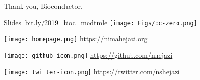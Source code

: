 \documentclass{beamer}
\begin{document}

\begin{frame}[c]{Thank you, Bioconductor.}

\large
Slides: \href{https://bit.ly/2019\_bioc\_modtmle}{bit.ly/2019\_bioc\_modtmle}
  \quad
\texttt{[image: Figs/cc-zero.png]}

\vspace{2mm}
\texttt{[image: homepage.png]} \url{https://nimahejazi.org}

\vspace{2mm}
\texttt{[image: github-icon.png]}
  \url{https://github.com/nhejazi}

\vspace{2mm}
\texttt{[image: twitter-icon.png]}
  \url{https://twitter.com/nshejazi}


\end{frame}
\end{document}
